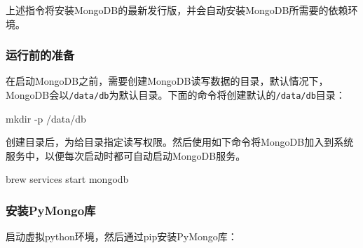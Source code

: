 \documentclass[]{ctexbook}
\newenvironment{Shaded}{\begin{snugshade}}{\end{snugshade}}
\newcommand{\BuiltInTok}[1]{#1}
\newcommand{\ExtensionTok}[1]{#1}
\newcommand{\FunctionTok}[1]{\textcolor[rgb]{0.00,0.00,0.00}{#1}}
\newcommand{\KeywordTok}[1]{\textcolor[rgb]{0.13,0.29,0.53}{\textbf{#1}}}
\newcommand{\NormalTok}[1]{#1}
\begin{document}
上述指令将安装MongoDB的最新发行版，并会自动安装MongoDB所需要的依赖环境。

\hypertarget{ux8fd0ux884cux524dux7684ux51c6ux5907}{%
\subsubsection{运行前的准备}\label{ux8fd0ux884cux524dux7684ux51c6ux5907}}

在启动MongoDB之前，需要创建MongoDB读写数据的目录，默认情况下，MongoDB会以\texttt{/data/db}为默认目录。下面的命令将创建默认的\texttt{/data/db}目录：

\begin{Shaded}
\begin{Highlighting}[]
\FunctionTok{mkdir}\NormalTok{ -p /data/db}
\end{Highlighting}
\end{Shaded}

创建目录后，为给目录指定读写权限。然后使用如下命令将MongoDB加入到系统服务中，以便每次启动时都可自动启动MongoDB服务。

\begin{Shaded}
\begin{Highlighting}[]
\ExtensionTok{brew}\NormalTok{ services start mongodb}
\end{Highlighting}
\end{Shaded}

\hypertarget{ux5b89ux88c5pymongoux5e93}{%
\subsubsection{安装PyMongo库}\label{ux5b89ux88c5pymongoux5e93}}

启动虚拟python环境，然后通过pip安装PyMongo库：

\begin{Shaded}
\end{Shaded}
\end{document}
